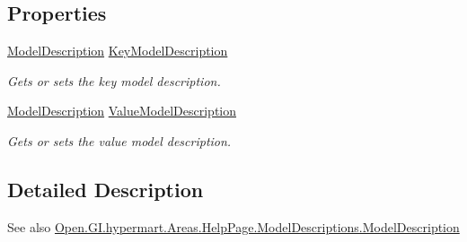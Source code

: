 \subsection*{Properties}
\begin{DoxyCompactItemize}
\item 
\hyperlink{class_open_1_1_g_i_1_1hypermart_1_1_areas_1_1_help_page_1_1_model_descriptions_1_1_model_description}{Model\+Description} \hyperlink{class_open_1_1_g_i_1_1hypermart_1_1_areas_1_1_help_page_1_1_model_descriptions_1_1_key_value_pair_model_description_a76ccd9d3ad532ce5a56b52d15d84c324}{Key\+Model\+Description}
\begin{DoxyCompactList}\small\item\em Gets or sets the key model description. \end{DoxyCompactList}\item 
\hyperlink{class_open_1_1_g_i_1_1hypermart_1_1_areas_1_1_help_page_1_1_model_descriptions_1_1_model_description}{Model\+Description} \hyperlink{class_open_1_1_g_i_1_1hypermart_1_1_areas_1_1_help_page_1_1_model_descriptions_1_1_key_value_pair_model_description_a5bcf18b1e78df6ba8b0cbc001a11ace6}{Value\+Model\+Description}
\begin{DoxyCompactList}\small\item\em Gets or sets the value model description. \end{DoxyCompactList}\end{DoxyCompactItemize}


\subsection{Detailed Description}


\begin{DoxySeeAlso}{See also}
\hyperlink{class_open_1_1_g_i_1_1hypermart_1_1_areas_1_1_help_page_1_1_model_descriptions_1_1_model_description}{Open.\+G\+I.\+hypermart.\+Areas.\+Help\+Page.\+Model\+Descriptions.\+Model\+Description}


\end{DoxySeeAlso}


